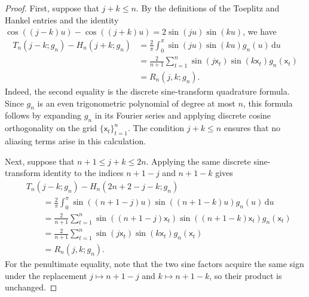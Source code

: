\documentclass[10pt,a4paper]{amsart}
\newcommand{\sfx}{\mathsf{x}}
\begin{document}
\begin{proof}
%
%
First, suppose that \(j+k\leq n\). By the definitions of the Toeplitz and Hankel entries and the identity \(\cos((j-k)u)-\cos((j+k)u)=2\sin(ju)\sin(ku)\), we have
\begin{align*}
T_n(j-k;g_n)-H_n(j+k;g_n)
&=
\frac{2}{\pi}
\int_0^\pi
\sin(ju)\sin(ku)g_n(u)\,\mathrm{d}u \\
&=
\frac{2}{n+1}
\sum_{t=1}^{n}
\sin(j\sfx_t)\sin(k\sfx_t)g_n(\sfx_t) \\
&=
R_n(j,k;g_n).
\end{align*}
Indeed, the second equality is the discrete sine-transform quadrature formula. Since \(g_n\) is an even trigonometric polynomial of degree at most \(n\), this formula follows by expanding \(g_n\) in its Fourier series and applying discrete cosine orthogonality on the grid \(\{\sfx_t\}_{t=1}^n\). The condition \(j+k\leq n\) ensures that no aliasing terms arise in this calculation.




Next, suppose that \(n+1\leq j+k\leq 2n\). Applying the same discrete sine-transform identity to the indices \(n+1-j\) and \(n+1-k\) gives
\begin{align*}
&T_n(j-k;g_n)-H_n(2n+2-j-k;g_n) \\
&\qquad =
\frac{2}{\pi}
\int_0^\pi
\sin ((n+1-j)u)
\sin ((n+1-k)u)
g_n(u)\,\mathrm{d}u \\
&\qquad =
\frac{2}{n+1}
\sum_{t=1}^{n}
\sin ((n+1-j)\sfx_t)
\sin ((n+1-k)\sfx_t)
g_n(\sfx_t) \\
&\qquad =
\frac{2}{n+1}
\sum_{t=1}^{n}
\sin(j\sfx_t)\sin(k\sfx_t)g_n(\sfx_t) \\
&\qquad =
R_n(j,k;g_n).
\end{align*}
For the penultimate equality, note that the two sine factors acquire the same sign under the replacement \(j\mapsto n+1-j\) and \(k\mapsto n+1-k\), so their product is unchanged.


\end{proof}
\end{document}
